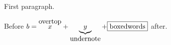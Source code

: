 \documentclass{article}
\begin{document}
First paragraph.

Before $b = \overset{\mbox{over\par top}}{x} + \underbrace{y}_{\makebox{under\par note}} + \fbox{boxed\par words} \lxmbf$ after.
\end{document}
